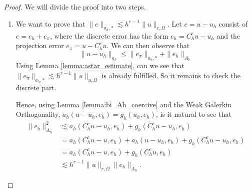\begin{proof}
    We will divide the proof into two steps.
    \begin{enumerate}[label=\arabic*)]
        \item We want to prove that $\| e \|_{ a_{h},* }^{  } \lesssim   h^{r-1} \| u \|_{ r,\Omega  }^{  }$.
    Let $e = u - u_{h}$ consist of $e = e_{h} + e_{\pi }$, where the discrete error has the form $e_{h} = C _{h}^{e} u - u_{h}$ and the projection error $e_{\pi } = u - C _{h} ^{e}u$. We can then observe that
    \[
    \| u - u_{h} \|_{ a_{h} }^{  }  \le \| e_{\pi } \|_{a_{h},*}^{  } + \| e_{h} \|_{A_{h}  }^{  }
    \]
Using Lemma \ref{lemma:astar_estimate}, can we see that $\| e_{\pi } \|_{a_{h},*}^{  } \lesssim h^{r-1} \| u \|_{ u,\Omega  }^{  }  $ is already fulfilled. So it remains to check the discrete part.

Hence, using Lemma \ref{lemma:bi_Ah_coercive} and
the Weak Galerkin Orthogonality, $ a_{h}( u - u_{h}, e_{h}) = g_{h}( u_{h}, e_{h})$, is it natural to see that \[
    \begin{split}
\| e_{h} \|_{ A_{h} }^{ 2 } & \lesssim a_{h}( C _{h}^{e} u - u_{h}, e_{h}) + g_{h}( C _{h}^{e}u - u_{h}, e_{h}) \\
 & = a_{h}( C _{h}^{e} u - u, e_{h}) + a_{h}( u - u_{h}, e_{h}) + g_{h}( C _{h}^{e}u - u_{h}, e_{h}) \\
 & = a_{h}( C _{h}^{e} u - u, e_{h}) + g_{h}( C _{h}^{e}u, e_{h}) \\
 & \lesssim h^{r-1} \| u \|_{ r, \Omega  }^{  } \| e_{h} \|_{ A_{h} }^{  }.
    \end{split}
\]

    \end{enumerate}
\end{proof}



